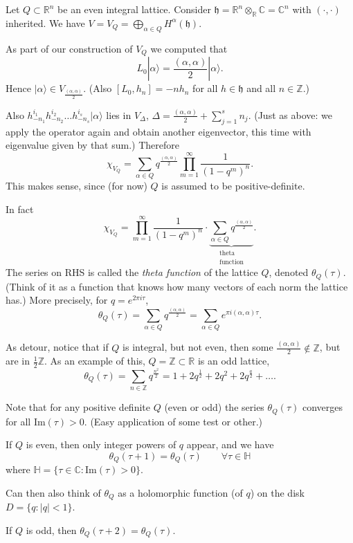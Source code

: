\begin{example}
\label{example-latti-verte-algeb-chara}
Let $Q \subset \mathbb{R}^n$ be an even
integral lattice.
Consider
$\mathfrak{h}=\mathbb{R}^n
\otimes_{\mathbb{R}} \mathbb{C}=\mathbb{C}^n$
with $(\cdot,\cdot)$ inherited.
We have $V=V_Q=\bigoplus_{\alpha \in
Q}H^\alpha(\mathfrak{h})$.

As part of our construction of $V_Q$ we
computed that
$$
L_0|\alpha\rangle=\frac{(\alpha,\alpha)}{2}
|\alpha\rangle.
$$
Hence $|\alpha\rangle\in
V_{\frac{(\alpha,\alpha)}{2}}$.
(Also $[L_0,h_n]=-nh_n$
for all $h \in \mathfrak{h}$ and all $n \in
\mathbb{Z}$.)

Also $h_{-n_1}^{i_1}h_{-n_2}^{i_2}\ldots
h_{-n_s}^{i_s}|\alpha\rangle$
lies in $V_{\Delta}$,
$\Delta=\frac{(\alpha,\alpha)}{2}
+\sum_{j=1}^sn_j$. (Just as above: we apply
the operator again
and obtain another eigenvector, this time
with eigenvalue given by that sum.)
Therefore
$$
\chi_{V_Q}=\sum_{\alpha \in
Q}q^{\frac{(\alpha,\alpha)}{2}}
\prod_{m=1}^\infty \frac{1}{(1-q^m)^n}.
$$
This makes sense, since (for now) $Q$ is
assumed to be positive-definite.

In fact
$$
\chi_{V_Q}=\prod_{m=1}^\infty\frac{1}{(1-q^m)
^n}\cdot
\underbrace{\sum_{\alpha \in
Q}q^{\frac{(\alpha,\alpha)}{2}}}_{
\substack{\text{theta} \\ \text{function}}}.
$$
The series on RHS is called the {\it theta
function}
of the lattice $Q$, denoted $\theta_Q(\tau)$.
(Think of it as a function that knows how
many vectors of each
norm the lattice has.)
More precisely, for $q=e^{2\pi i \tau}$,
$$
\theta_Q(\tau)=\sum_{\alpha \in
Q}q^{\frac{(\alpha,\alpha)}{2}}
=\sum_{\alpha \in Q}e^{\pi i
(\alpha,\alpha)\tau}.
$$

As detour, notice that if $Q$ is integral,
but not even,
then some $\frac{(\alpha,\alpha)}{2} \not \in
\mathbb{Z}$,
but are in $\frac{1}{2}\mathbb{Z}$.
As an example of this, $Q=\mathbb{Z} \subset
\mathbb{R}$ is
an odd lattice,
$$
\theta_Q(\tau)=
\sum_{n \in \mathbb{Z}}q^{\frac{n^2}{2}}
=1+2q^{\frac{1}{2}}+2q^2+2q^{\frac{a}{2}}+
\ldots.
$$
\end{example}

\begin{remark}
\label{remark-theta-function-converges}
Note that for any positive definite $Q$ (even
or odd)
the series $\theta_Q(\tau)$ converges for all
$\text{Im}(\tau)>0$.
(Easy application of some test or other.)

If $Q$ is even, then only integer powers of
$q$
appear, and we have
$$
\theta_Q(\tau+1)=\theta_Q(\tau)\qquad \forall
\tau\in \mathbb{H}
$$
where $\mathbb{H}=\{\tau \in
\mathbb{C}:\text{Im}(\tau)>0\}$.

Can then also think of $\theta_Q$ as a
holomorphic
function (of $q$) on the disk
$D=\{q:|q|<1\}$.

If $Q$ is odd, then
$\theta_Q(\tau+2)=\theta_Q(\tau)$.
\end{remark}

